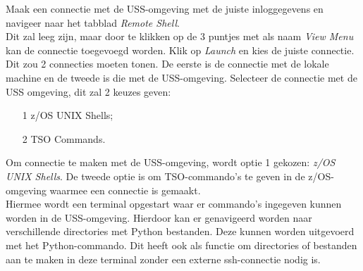 Maak een connectie met de USS-omgeving met de juiste inloggegevens en navigeer naar het tabblad \textit{Remote Shell}. \\

Dit zal leeg zijn, maar door te klikken op de 3 puntjes met als naam \textit{View Menu} kan de connectie toegevoegd worden. Klik op \textit{Launch} en kies de juiste connectie. Dit zou 2 connecties moeten tonen. De eerste is de connectie met de lokale machine en de tweede is die met de USS-omgeving. Selecteer de connectie met de USS omgeving, dit zal 2 keuzes geven:

\begin{itemize}
    \item[1] z/OS UNIX Shells;
    \item[2] TSO Commands.
\end{itemize}

Om connectie te maken met de USS-omgeving, wordt optie 1 gekozen: \textit{z/OS UNIX Shells}. De tweede optie is om TSO-commando's te geven in de z/OS-omgeving waarmee een connectie is gemaakt. \\

Hiermee wordt een terminal opgestart waar er commando's ingegeven kunnen worden in de USS-omgeving. Hierdoor kan er genavigeerd worden naar verschillende directories met Python bestanden. Deze kunnen worden uitgevoerd met het Python-commando. Dit heeft ook als functie om directories of bestanden aan te maken in deze terminal zonder een externe ssh-connectie nodig is. \\

